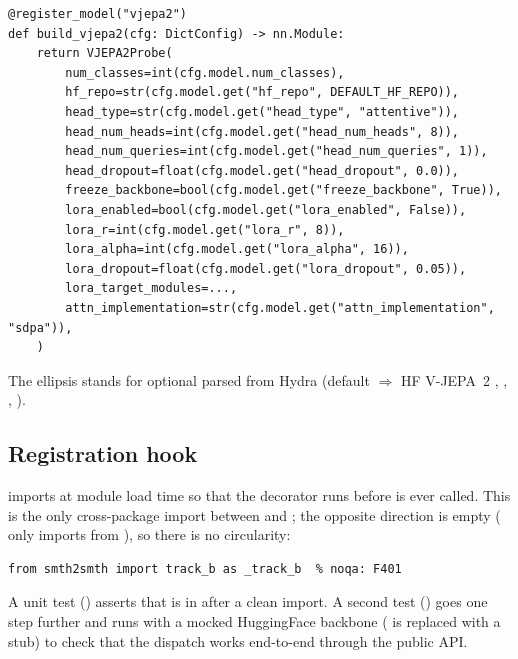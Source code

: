 \begin{lstlisting}[style=py]
@register_model("vjepa2")
def build_vjepa2(cfg: DictConfig) -> nn.Module:
    return VJEPA2Probe(
        num_classes=int(cfg.model.num_classes),
        hf_repo=str(cfg.model.get("hf_repo", DEFAULT_HF_REPO)),
        head_type=str(cfg.model.get("head_type", "attentive")),
        head_num_heads=int(cfg.model.get("head_num_heads", 8)),
        head_num_queries=int(cfg.model.get("head_num_queries", 1)),
        head_dropout=float(cfg.model.get("head_dropout", 0.0)),
        freeze_backbone=bool(cfg.model.get("freeze_backbone", True)),
        lora_enabled=bool(cfg.model.get("lora_enabled", False)),
        lora_r=int(cfg.model.get("lora_r", 8)),
        lora_alpha=int(cfg.model.get("lora_alpha", 16)),
        lora_dropout=float(cfg.model.get("lora_dropout", 0.05)),
        lora_target_modules=...,
        attn_implementation=str(cfg.model.get("attn_implementation", "sdpa")),
    )
\end{lstlisting}
The ellipsis stands for optional  parsed from
Hydra (default  \(\Rightarrow\) HF V-JEPA~2
, , , ).

\subsection{Registration hook}

 imports  at
module load time so that the  decorator
runs before  is ever called. This is the only
cross-package import between  and ; the
opposite direction is empty ( only imports from
), so there is no circularity:
\begin{lstlisting}[style=py]
% src/smth2smth/shared/models/__init__.py
from smth2smth import track_b as _track_b  % noqa: F401
\end{lstlisting}

A unit test () asserts that
 is in  after a clean
import. A second test ()
goes one step further and runs  with a mocked
HuggingFace backbone ( is replaced
with a stub) to check that the dispatch works end-to-end through the
public API.

